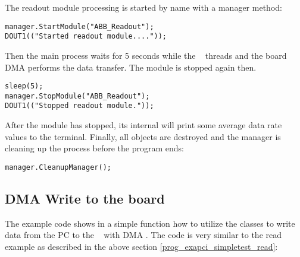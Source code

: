 \begin{compactenum}
\item The readout module processing 
is started by name with a manager method:
\begin{small}
\begin{verbatim}
manager.StartModule("ABB_Readout");
DOUT1(("Started readout module...."));
\end{verbatim}
\end{small}
Then the main process waits for 5 seconds while the \dabc~ threads
and the board DMA performs the data transfer. The module is stopped
again then.
\begin{small}
\begin{verbatim}      
sleep(5);
manager.StopModule("ABB_Readout");
DOUT1(("Stopped readout module."));
\end{verbatim}
\end{small}
After the module has stopped, its internal 
will print some average data rate values to the terminal.
Finally, all objects are destroyed and the manager is
cleaning up the process before the program ends:
\begin{small}
\begin{verbatim} 
manager.CleanupManager();
\end{verbatim}
\end{small}
   
\end{compactenum} 

\subsection{DMA Write to the board}
\label{prog_exapci_simpletest_write}
The example code  shows in a
simple  function how to utilize the
 classes to write data from the PC to the \ABB~ 
with DMA . 
The code is very similar to the read example as described
in the above section \ref{prog_exapci_simpletest_read}:


